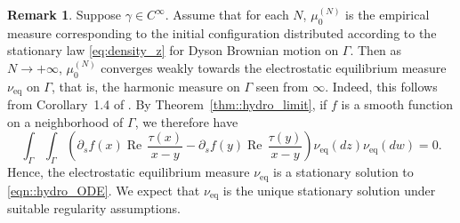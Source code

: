 \documentclass[11pt]{article}
\renewcommand{\Re}{\operatorname{Re}\,}
\numberwithin{equation}{section}
\theoremstyle{definition}
\newtheorem{remark}[theorem]{Remark}
\begin{document}
\begin{remark}
Suppose $\gamma\in C^{\infty}$. Assume that for each $N$, $\mu_{0}^{(N)}$ is the empirical measure corresponding to the initial configuration distributed according to the stationary law \eqref{eq:density_z} for Dyson Brownian motion on $\Gamma$. Then as $N\to+\infty$, $\mu_{0}^{(N)}$ converges weakly towards the electrostatic equilibrium measure $\nu_{\textrm{eq}}$ on $\Gamma$, that is, the harmonic measure on $\Gamma$ seen from $\infty$. Indeed, this follows from Corollary~1.4 of \cite{Courteaut-Johansson-2025}. By Theorem~\ref{thm::hydro_limit}, if $f$ is a smooth function on a neighborhood of $\Gamma$, we therefore have
\begin{equation}\label{eqn::hydro_ODE}
\int_\Gamma\int_\Gamma\left(\partial_s f(x)\Re\frac{\tau(x)}{x-y}-\partial_s f(y)\Re\frac{\tau(y)}{x-y}\right)\nu_{\textrm{eq}}(dz)\nu_{\textrm{eq}}(dw)=0.
\end{equation}
Hence, the electrostatic equilibrium measure $\nu_{\textrm{eq}}$ is a stationary solution to \eqref{eqn::hydro_ODE}. We expect that $\nu_{\textrm{eq}}$ is the unique stationary solution under suitable regularity assumptions. 
\end{remark}

\appendix
\end{document}

